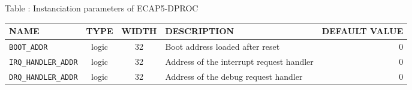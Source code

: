 {
  \vspace{0.5em}
  \begin{center}
    Table \thetable: Instanciation parameters of ECAP5-DPROC\label{tab:instanciation-parameters}
  \end{center}

\footnotesize
\begin{xltabular}{0.9\textwidth}{|l|c|c|X|r|}
  \hline
  \textbf{NAME} & \textbf{TYPE} & \textbf{WIDTH} & \textbf{DESCRIPTION} & \textbf{DEFAULT VALUE} \\
  \hline
  \texttt{BOOT\_ADDR} & logic & 32 & Boot address loaded after reset & 0 \\
  \hline
  \texttt{IRQ\_HANDLER\_ADDR} & logic & 32 & Address of the interrupt request handler & 0 \\
  \hline
  \texttt{DRQ\_HANDLER\_ADDR} & logic & 32 & Address of the debug request handler & 0 \\
  \hline
\end{xltabular}
}
